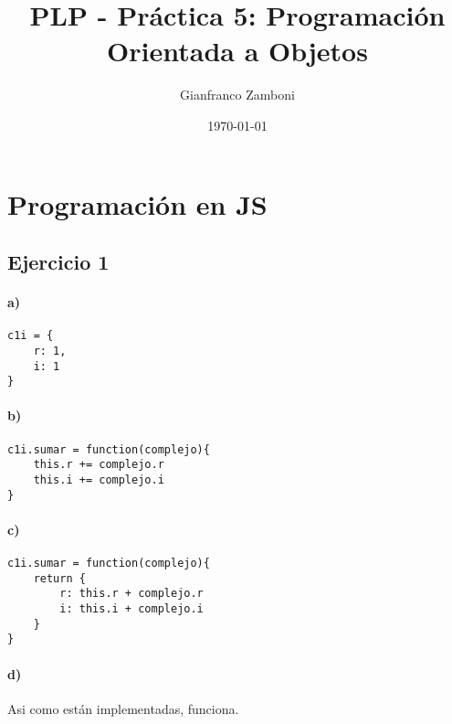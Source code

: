 \documentclass[10pt,a4paper]{article}
\begin{document}
\title{PLP - Práctica 5: Programación Orientada a Objetos}
%
\date{\today}
%
\author{Gianfranco Zamboni}
%
\maketitle
\setcounter{page}{1}
%
\section*{Programación en JS}
\subsection{Ejercicio 1}
\begin{multicols}{2}
\paragraph{a)}
\begin{centrado2}
\begin{verbatim}
c1i = {
    r: 1,
    i: 1
}
\end{verbatim}
\end{centrado2}
\paragraph{b)}
\begin{centrado2}
\begin{verbatim}
c1i.sumar = function(complejo){
    this.r += complejo.r
    this.i += complejo.i
}
\end{verbatim}
\end{centrado2}
\end{multicols}
\begin{multicols}{2}
\paragraph{c)}
\begin{centrado2}
\begin{verbatim}
c1i.sumar = function(complejo){
    return {
        r: this.r + complejo.r
        i: this.i + complejo.i
    }
}
\end{verbatim}
\end{centrado2}

\paragraph{d)} Asi como están implementadas, funciona.
\end{multicols}
\end{document}
